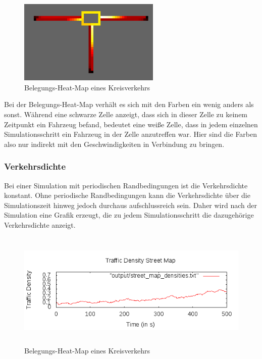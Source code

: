 \documentclass[11pt, a4paper]{article}
\begin{document}
\begin{figure}[h!]
	\centering
	\includegraphics[height=4cm]{img/vis_roundabout_occupancy_heat_map}
	\caption{Belegungs-Heat-Map eines Kreisverkehrs}
	\label{fig:occupancyMapRoundabout}
\end{figure}

Bei der Belegungs-Heat-Map verhält es sich mit den Farben ein wenig anders als sonst. Während eine schwarze Zelle anzeigt, dass sich in dieser Zelle zu keinem Zeitpunkt ein Fahrzeug befand, bedeutet eine weiße Zelle, dass in jedem einzelnen Simulationsschritt ein Fahrzeug in der Zelle anzutreffen war. Hier sind die Farben also nur indirekt mit den Geschwindigkeiten in Verbindung zu bringen.

\subsubsection{Verkehrsdichte}
\label{subsubsec:verkehrsdichte}

Bei einer Simulation mit periodischen Randbedingungen ist die Verkehrsdichte konstant. Ohne periodische Randbedingungen kann die Verkehrsdichte über die Simulationszeit hinweg jedoch durchaus aufschlussreich sein. Daher wird nach der Simulation eine Grafik erzeugt, die zu jedem Simulationsschritt die dazugehörige Verkehrsdichte anzeigt.
\begin{figure}[h!]
	\centering
	\includegraphics[width=15cm,height=5.58cm]{img/vis_street_map_densities}
	\caption{Belegungs-Heat-Map eines Kreisverkehrs}
	\label{fig:occupancyMapRoundabout}
\end{figure}
\end{document}
